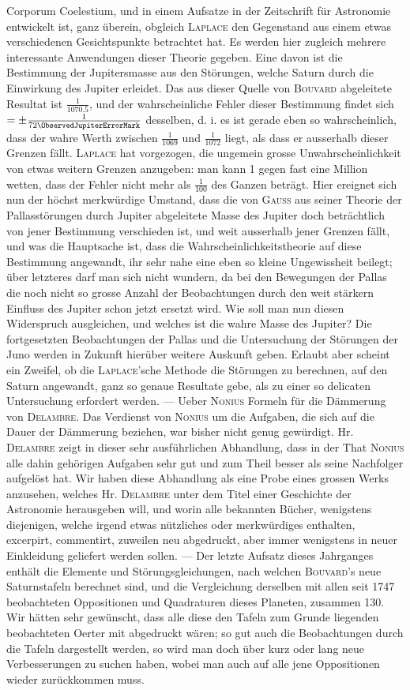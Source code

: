 \noindent Corporum Coelestium, und in einem Aufsatze in der Zeitschrift für Astronomie entwickelt ist, ganz überein, obgleich \textsc{Laplace} den Gegenstand aus einem etwas verschiedenen Gesichtspunkte betrachtet hat. Es werden hier zugleich mehrere interessante Anwendungen dieser Theorie gegeben. Eine davon ist die Bestimmung der Jupitersmasse aus den Störungen, welche Saturn durch die Einwirkung des Jupiter erleidet. Das aus dieser Quelle von \textsc{Bouvard} abgeleitete Resultat ist $\frac{1}{1070.5}$, und der wahrscheinliche Fehler dieser Bestimmung findet sich $= \pm \frac{1}{72\ObservedJupiterErrorMark}$ desselben, d. i. es ist gerade eben so wahrscheinlich, dass der wahre Werth zwischen $\frac{1}{1069}$ und $\frac{1}{1072}$ liegt, als dass er ausserhalb dieser Grenzen fällt. \textsc{Laplace} hat vorgezogen, die ungemein grosse Unwahrscheinlichkeit von etwas weitern Grenzen anzugeben: man kann 1 gegen fast eine Million wetten, dass der Fehler nicht mehr als $\frac{1}{100}$ des Ganzen beträgt. Hier ereignet sich nun der höchst merkwürdige Umstand, dass die von \textsc{Gauss} aus seiner Theorie der Pallasstörungen durch Jupiter abgeleitete Masse des Jupiter doch beträchtlich von jener Bestimmung verschieden ist, und weit ausserhalb jener Grenzen fällt, und was die Hauptsache ist, dass die Wahrscheinlichkeitstheorie auf diese Bestimmung angewandt, ihr sehr nahe eine eben so kleine Ungewissheit beilegt; über letzteres darf man sich nicht wundern, da bei den Bewegungen der Pallas die noch nicht so grosse Anzahl der Beobachtungen durch den weit stärkern Einfluss des Jupiter schon jetzt ersetzt wird. Wie soll man nun diesen Widerspruch ausgleichen, und welches ist die wahre Masse des Jupiter? Die fortgesetzten Beobachtungen der Pallas und die Untersuchung der Störungen der Juno werden in Zukunft hierüber weitere Auskunft geben. Erlaubt aber scheint ein Zweifel, ob die \textsc{Laplace}'sche Methode die Störungen zu berechnen, auf den Saturn angewandt, ganz so genaue Resultate gebe, als zu einer so delicaten Untersuchung erfordert werden. --- Ueber \textsc{Nonius} Formeln für die Dämmerung von \textsc{Delambre}. Das Verdienst von \textsc{Nonius} um die Aufgaben, die sich auf die Dauer der Dämmerung beziehen, war bisher nicht genug gewürdigt. Hr. \textsc{Delambre} zeigt in dieser sehr ausführlichen Abhandlung, dass in der That \textsc{Nonius} alle dahin gehörigen Aufgaben sehr gut und zum Theil besser als seine Nachfolger aufgelöst hat. Wir haben diese Abhandlung als eine Probe eines grossen Werks anzusehen, welches Hr. \textsc{Delambre} unter dem Titel einer Geschichte der Astronomie herausgeben will, und worin alle bekannten Bücher, wenigstens diejenigen, welche irgend etwas nützliches oder merkwürdiges enthalten, excerpirt, commentirt, zuweilen neu abgedruckt, aber immer wenigstens in neuer Einkleidung geliefert werden sollen. --- Der letzte Aufsatz dieses Jahrganges enthält die Elemente und Störungsgleichungen, nach welchen \textsc{Bouvard}'s neue Saturnstafeln berechnet sind, und die Vergleichung derselben mit allen seit 1747 beobachteten Oppositionen und Quadraturen dieses Planeten, zusammen 130. Wir hätten sehr gewünscht, dass alle diese den Tafeln zum Grunde liegenden beobachteten Oerter mit abgedruckt wären; so gut auch die Beobachtungen durch die Tafeln dargestellt werden, so wird man doch über kurz oder lang neue Verbesserungen zu suchen haben, wobei man auch auf alle jene Oppositionen wieder zurückkommen muss.
